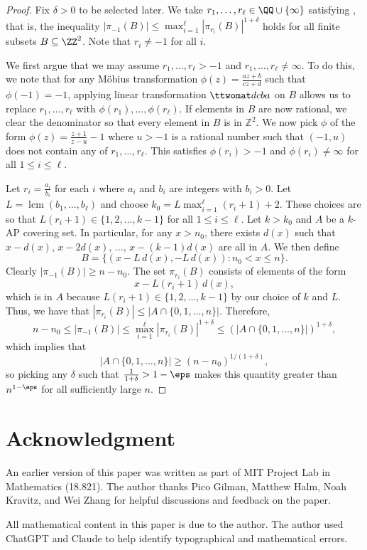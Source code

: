 \documentclass[11pt,reqno]{amsart}
\begin{document}
\begin{proof}
Fix $\delta>0$ to be selected later.
We take $r_1,\dots,r_\ell \in \QQ\cup\{\infty\}$ 
satisfying , 
that is, the inequality $|\pi_{-1}(B)| \leq \max_{i=1}^\ell 
|\pi_{r_i}(B)|^{1+\delta}$ holds for all finite subsets 
$B\subseteq \ZZ^2$.
Note that $r_i\neq -1$ for all $i$.

We first argue that we may assume $r_1,\dots,r_\ell>-1$
and $r_1,\dots,r_\ell \neq\infty$.
To do this, we note that for any M\"obius transformation 
$\phi(z) = \frac{az+b}{cz+d}$ such that $\phi(-1)=-1$,
applying linear transformation $\ttwomat dcba$
on $B$ allows us to replace $r_1,\dots,r_\ell$
with $\phi(r_1), \dots, \phi(r_\ell)$.
If elements in $B$ are now rational, we clear the denominator 
so that every element in $B$ is in $\mathbb Z^2$.
We now pick $\phi$ of the form $\phi(z) = \frac{z+1}{z-u}-1$
where $u>-1$ is a rational number such that $(-1,u)$ does not contain any 
of $r_1,\dots,r_\ell$.
This satisfies $\phi(r_i) > -1$
and $\phi(r_i)\neq\infty$ for all $1\leq i\leq\ell$. 


Let $r_i = \frac{a_i}{b_i}$ for each $i$ where 
$a_i$ and $b_i$ are integers with $b_i>0$.
Let $L=\operatorname{lcm}(b_1,\dots,b_\ell)$ and
choose $k_0=L \max_{i=1}^\ell (r_i+1) + 2$.
These choices are so that $L(r_i+1)\in\{1,2,\dots,k-1\}$
for all $1\leq i\leq\ell$.
Let $k>k_0$ and $A$ be a $k$-AP covering set.
In particular, for any $x>n_0$, there exists $d(x)$
such that $x-d(x)$, $x-2d(x)$, $\dots$, $x-(k-1)d(x)$ 
are all in $A$.
We then define 
$$B = \{(x-L\,d(x), -L\,d(x)) : n_0<x\leq n\}.$$
Clearly $|\pi_{-1}(B)|\geq n-n_0$. 
The set $\pi_{r_i}(B)$ consists of elements of the form
$$x - L(r_i+1)\, d(x),$$
which is in $A$ because $L(r_i+1)\in \{1,2,\dots,k-1\}$
by our choice of $k$ and $L$.
Thus, we have that $|\pi_{r_i}(B)| \leq |A\cap\{0,1,\dots,n\}|$.
Therefore,
$$n-n_0 \leq |\pi_{-1}(B)| \leq 
\max_{i=1}^\ell |\pi_{r_i}(B)|^{1+\delta} \leq  
(|A\cap\{0,1,\dots,n\}|)^{1+\delta},$$
which implies that 
$$|A\cap\{0,1,\dots,n\}| \geq (n-n_0)^{1/(1+\delta)},$$
so picking any $\delta$ such that $\frac 1{1+\delta} > 1-\eps$ 
makes this quantity greater than $n^{1-\eps}$ 
for all sufficiently large $n$.
\end{proof}

\section*{Acknowledgment}
An earlier version of this paper was written as part of 
MIT Project Lab in Mathematics (18.821). 
The author thanks Pico Gilman, Matthew Halm, Noah Kravitz,
and Wei Zhang for helpful discussions and feedback on the paper.

All mathematical content in this paper is due to the author.
The author used ChatGPT and Claude to help identify typographical and mathematical errors.
\printbibliography
\end{document}
